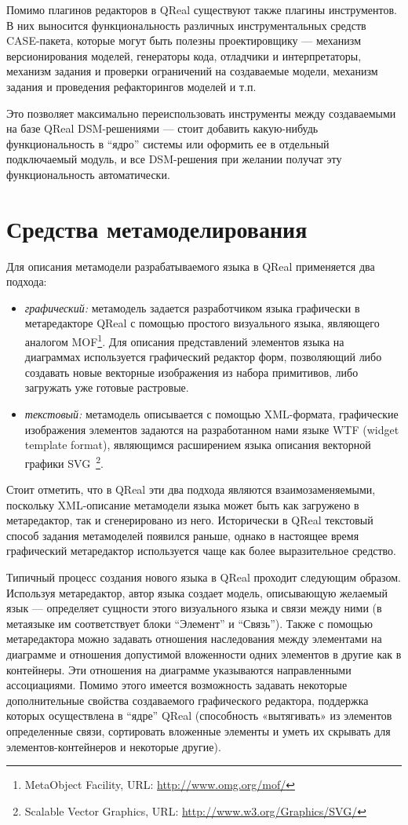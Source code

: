 \documentclass[a4, 12pt]{article}
\begin{document}
Помимо плагинов редакторов в QReal существуют также плагины инструментов. В них выносится функциональность различных инструментальных средств CASE-пакета, которые могут быть полезны проектировщику --- механизм версионирования моделей, генераторы кода, отладчики и интерпретаторы, механизм задания и проверки ограничений на создаваемые модели, механизм задания и проведения рефакторингов моделей и т.п. 

Это позволяет максимально переиспользовать инструменты между создаваемыми на базе QReal DSM-решениями --- стоит добавить какую-нибудь функциональность в ``ядро'' системы или оформить ее в отдельный подключаемый модуль, и все DSM-решения при желании получат эту функциональность автоматически. 

\section{Средства метамоделирования}

Для описания метамодели разрабатываемого языка в QReal применяется два подхода:
\begin{itemize}
 \item \textit{графический:} метамодель задается разработчиком языка графически в метаредакторе QReal с помощью простого визуального языка, являющего аналогом MOF\footnote{MetaObject Facility, URL: \url{http://www.omg.org/mof/}}. Для описания представлений элементов языка на диаграммах используется графический редактор форм, позволяющий либо создавать новые векторные изображения из набора примитивов, либо загружать уже готовые растровые.
 \item \textit{текстовый:} метамодель описывается с помощью XML-формата, графические изображения элементов задаются на разработанном нами языке WTF (widget template format), являющимся расширением языка описания векторной графики SVG~\footnote{Scalable Vector Graphics, URL: \url{http://www.w3.org/Graphics/SVG/}}.
\end{itemize}

Стоит отметить, что в QReal эти два подхода являются взаимозаменяемыми, поскольку XML-описание метамодели языка может быть как загружено в метаредактор, так и сгенерировано из него. Исторически в QReal текстовый способ задания метамоделей появился раньше, однако в настоящее время графический метаредактор используется чаще как более выразительное средство.

Типичный процесс создания нового языка в QReal проходит следующим образом. Используя метаредактор, автор языка создает модель, описывающую желаемый язык --- определяет сущности этого визуального языка и связи между ними (в метаязыке им соответствует блоки ``Элемент'' и ``Связь''). Также с помощью метаредактора можно задавать отношения наследования между элементами на диаграмме и отношения допустимой вложенности одних элементов в другие как в контейнеры. Эти отношения на диаграмме указываются направленными ассоциациями. Помимо этого имеется возможность задавать некоторые дополнительные свойства создаваемого графического редактора, поддержка которых осуществлена в “ядре” QReal (способность «вытягивать» из элементов определенные связи, сортировать вложенные элементы и уметь их скрывать для элементов-контейнеров и некоторые другие).
\end{document}
